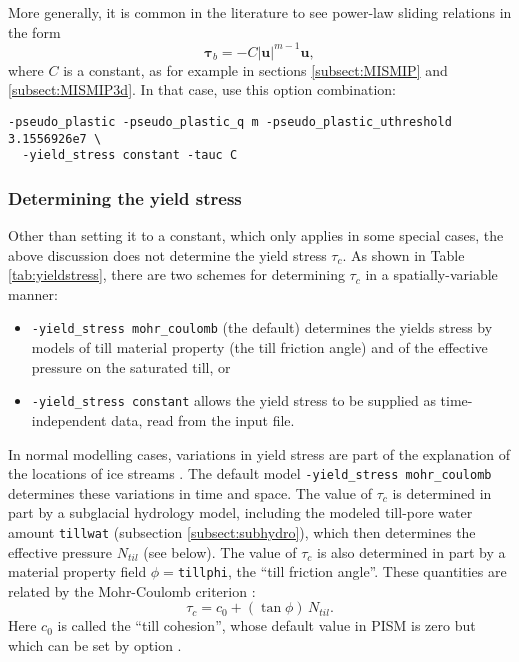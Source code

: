 More generally, it is common in the literature to see power-law sliding relations in the form
\begin{equation*}
  \boldsymbol{\tau}_b = - C |\mathbf{u}|^{m-1} \mathbf{u},
\end{equation*}
where $C$ is a constant, as for example in sections \ref{subsect:MISMIP} and \ref{subsect:MISMIP3d}.  In that case, use this option combination:
\begin{verbatim}
-pseudo_plastic -pseudo_plastic_q m -pseudo_plastic_uthreshold 3.1556926e7 \
  -yield_stress constant -tauc C
\end{verbatim}

\subsubsection*{Determining the yield stress}

Other than setting it to a constant, which only applies in some special cases, the above discussion does not determine the yield stress $\tau_c$.  As shown in Table \ref{tab:yieldstress}, there are two schemes for determining $\tau_c$ in a spatially-variable manner:
\begin{itemize}
\item \texttt{-yield_stress mohr_coulomb} (the default) determines the yields stress by models of till material property (the till friction angle) and of the effective pressure on the saturated till, or
\item \texttt{-yield_stress constant} allows the yield stress to be supplied as time-independent data, read from the input file.
\end{itemize}

In normal modelling cases, variations in yield stress are part of the explanation of the locations of ice streams \cite{SchoofStream}.  The default model \texttt{-yield_stress mohr_coulomb} determines these variations in time and space.  The value of $\tau_c$ is determined in part by a subglacial hydrology model, including the modeled till-pore water amount \texttt{tillwat} (subsection \ref{subsect:subhydro}), which then determines the effective pressure $N_{til}$ (see below).  The value of $\tau_c$ is also determined in part by a material property field $\phi=$\texttt{tillphi}, the ``till friction angle''.  These quantities are related by the Mohr-Coulomb criterion \cite{CuffeyPaterson}:
\begin{equation}
   \tau_c = c_{0} + (\tan\phi)\,N_{til}.  \label{eq:mohrcoulomb}
\end{equation}
Here $c_0$ is called the ``till cohesion'', whose default value in PISM is zero \cite[formula (2.4)]{SchoofStream} but which can be set by option .

